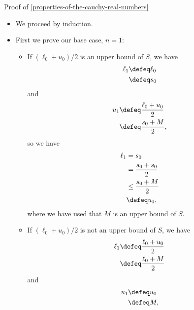 \begin{Proof}{Proof of \cref{properties-of-the-cauchy-real-numbers}}
\begin{itemize}
            \begin{itemize}
                \item We proceed by induction.
                \item First we prove our base case, $n=1$:
                    \begin{itemize}
                        \item If $(\ell_{0}+u_{0})/2$ is an upper bound of $S$, we have
                            \begin{align*}
                                \ell_{1} &\defeq \ell_{0}\\
                                         &\defeq s_{0}
                            \end{align*}
                             and
                            \begin{align*}
                                u_{1} &\defeq \frac{\ell_{0}+u_{0}}{2}\\
                                      &\defeq \frac{s_{0}+M}{2},
                            \end{align*}
                            so we have
                            \begin{align*}
                                \ell_{1} &=      s_{0}\\
                                         &=      \frac{s_{0}+s_{0}}{2}\\
                                         &\leq   \frac{s_{0}+M}{2}\\
                                         &\defeq u_{1},
                            \end{align*}
                            where we have used that $M$ is an upper bound of $S$.
                        \item If $(\ell_{0}+u_{0})/2$ is not an upper bound of $S$, we have
                            \begin{align*}
                                \ell_{1} &\defeq \frac{\ell_{0}+u_{0}}{2}\\
                                         &\defeq \frac{\ell_{0}+M}{2}
                            \end{align*}
                            and
                            \begin{align*}
                                u_{1} &\defeq u_{0}\\
                                      &\defeq M,
                            \end{align*}

\end{itemize}
\end{itemize}
\end{itemize}
\end{Proof}
